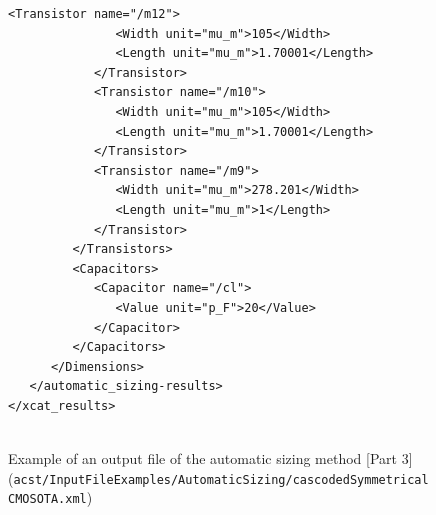 \begin{figure}[H]
	\begin{lstlisting}[basicstyle=\ttfamily\scriptsize,backgroundcolor={\color{gray!30}}, escapechar=? ]
            <Transistor name="/m12">
               <Width unit="mu_m">105</Width>
               <Length unit="mu_m">1.70001</Length>
            </Transistor>
            <Transistor name="/m10">
               <Width unit="mu_m">105</Width>
               <Length unit="mu_m">1.70001</Length>
            </Transistor>
            <Transistor name="/m9">
               <Width unit="mu_m">278.201</Width>
               <Length unit="mu_m">1</Length>
            </Transistor>
         </Transistors>
         <Capacitors>
            <Capacitor name="/cl">
               <Value unit="p_F">20</Value>
            </Capacitor>
         </Capacitors>
      </Dimensions>
   </automatic_sizing-results>
</xcat_results>
		
	\end{lstlisting}
	\caption{Example of an output file of the automatic sizing method [Part 3] ({\tt acst/\protect \linebreak InputFileExamples/AutomaticSizing/cascodedSymmetricalCMOSOTA.xml})}
\end{figure}

